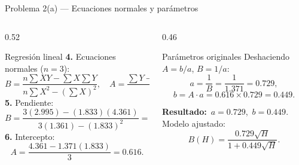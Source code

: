 \documentclass[aspectratio=169,10pt]{beamer}
\begin{document}
\begin{frame}{Problema 2(a) — Ecuaciones normales y parámetros}
\begin{columns}[T]
\begin{column}{0.52\textwidth}
\begin{cardgear}{Regresión lineal}{\faCalculator}
{\footnotesize
\textbf{4.} Ecuaciones normales ($n=3$):
\[
B=\frac{n\sum XY-\sum X\sum Y}{n\sum X^2-(\sum X)^2},\quad
A=\frac{\sum Y-B\sum X}{n}.
\]
\textbf{5.} Pendiente:
\[
B=\frac{3(2.995)-(1.833)(4.361)}{3(1.361)-(1.833)^2}=\frac{0.989}{0.723}=1.371.
\]
\textbf{6.} Intercepto:
\[
A=\frac{4.361-1.371(1.833)}{3}=0.616.
\]}
\end{cardgear}
\end{column}
\begin{column}{0.46\textwidth}
\begin{cardidea}{Parámetros originales}{\faSuperscript}
{\footnotesize Deshaciendo $A=b/a$, $B=1/a$:
\[
a=\frac1B=\frac1{1.371}=0.729,
\]
\[
b=A\cdot a=0.616\times0.729=0.449.
\]}
\end{cardidea}
\vspace{1mm}
\begin{cardnota}[\faCheckCircle]
{\footnotesize \textbf{Resultado:}\ $a=0.729$,\ $b=0.449$.\\[0.4mm]
Modelo ajustado:
\[
B(H)=\frac{0.729\sqrt H}{1+0.449\sqrt H}.
\]}
\end{cardnota}
\end{column}
\end{columns}
\end{frame}
\end{document}
